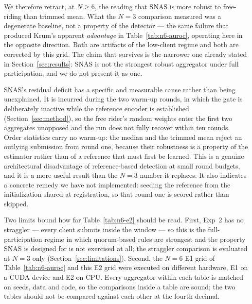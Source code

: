 \documentclass[pdflatex,sn-mathphys-num]{sn-jnl}
\begin{document}
We therefore retract, at $N\geq6$, the reading that SNAS is more robust to free-riding than trimmed mean. What the $N=3$ comparison measured was a degenerate baseline, not a property of the detector --- the same failure that produced Krum's apparent \emph{advantage} in Table~\ref{tab:n6-auroc}, operating here in the opposite direction. Both are artifacts of the low-client regime and both are corrected by this grid. The claim that survives is the narrower one already stated in Section~\ref{sec:results}: SNAS is not the strongest robust aggregator under full participation, and we do not present it as one.

SNAS's residual deficit has a specific and measurable cause rather than being unexplained. It is incurred during the two warm-up rounds, in which the gate is deliberately inactive while the reference encoder is established (Section~\ref{sec:method}), so the free rider's random weights enter the first two aggregates unopposed and the run does not fully recover within ten rounds. Order statistics carry no warm-up: the median and the trimmed mean reject an outlying submission from round one, because their robustness is a property of the estimator rather than of a reference that must first be learned. This is a genuine architectural disadvantage of reference-based detection at small round budgets, and it is a more useful result than the $N=3$ number it replaces. It also indicates a concrete remedy we have not implemented: seeding the reference from the initialization shared at registration, so that round one is scored rather than skipped.

Two limits bound how far Table~\ref{tab:n6-e2} should be read. First, Exp~2 has no straggler --- every client submits inside the window --- so this is the full-participation regime in which quorum-based rules are strongest and the property SNAS is designed for is not exercised at all; the straggler comparison is evaluated at $N=3$ only (Section~\ref{sec:limitations}). Second, the $N=6$ E1 grid of Table~\ref{tab:n6-auroc} and this E2 grid were executed on different hardware, E1 on a CUDA device and E2 on CPU. Every aggregator within each table is matched on seeds, data and code, so the comparisons inside a table are sound; the two tables should not be compared against each other at the fourth decimal.
\end{document}
